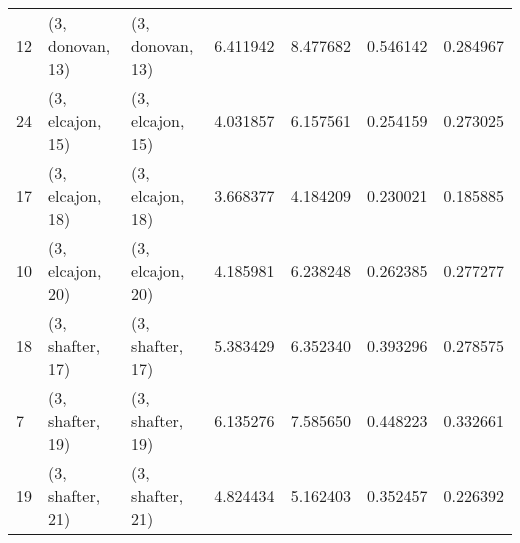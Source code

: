 \begin{tabular}{lllrrrr}
12 &  (3, donovan, 13) &  (3, donovan, 13) &  6.411942 &  8.477682 &   0.546142 &  0.284967 \\
24 &  (3, elcajon, 15) &  (3, elcajon, 15) &  4.031857 &  6.157561 &   0.254159 &  0.273025 \\
17 &  (3, elcajon, 18) &  (3, elcajon, 18) &  3.668377 &  4.184209 &   0.230021 &  0.185885 \\
10 &  (3, elcajon, 20) &  (3, elcajon, 20) &  4.185981 &  6.238248 &   0.262385 &  0.277277 \\
18 &  (3, shafter, 17) &  (3, shafter, 17) &  5.383429 &  6.352340 &   0.393296 &  0.278575 \\
7  &  (3, shafter, 19) &  (3, shafter, 19) &  6.135276 &  7.585650 &   0.448223 &  0.332661 \\
19 &  (3, shafter, 21) &  (3, shafter, 21) &  4.824434 &  5.162403 &   0.352457 &  0.226392 \\
\bottomrule
\end{tabular}
